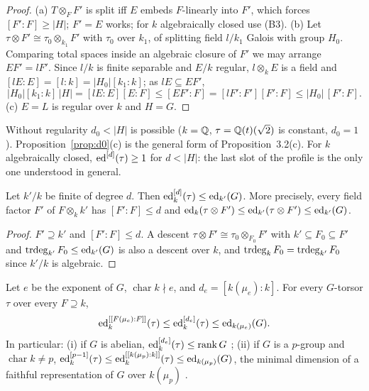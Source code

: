 \begin{proof}
(a) $T\otimes_FF'$ is split iff $E$ embeds $F$-linearly into $F'$, which forces
$[F':F]\ge|H|$; $F'=E$ works; for $k$ algebraically closed use (B3).
(b) Let $\tau\otimes F'\cong\tau_0\otimes_{k_1}F'$ with $\tau_0$ over $k_1$, of
splitting field $l/k_1$ Galois with group $H_0$. Comparing total spaces inside an
algebraic closure of $F'$ we may arrange $EF'=lF'$. Since $l/k$ is finite separable
and $E/k$ regular, $l\otimes_kE$ is a field and $[lE:E]=[l:k]=|H_0|[k_1:k]$; as
$lE\subseteq EF'$,
\[
|H_0|[k_1:k]\,|H|=[lE:E][E:F]\le[EF':F]=[lF':F'][F':F]\le|H_0|\,[F':F].
\]
(c) $E=L$ is regular over $k$ and $H=G$.
\end{proof}

\begin{remark}
Without regularity $d_0<|H|$ is possible ($k=\mathbb Q$, $\tau=\mathbb Q(t)(\sqrt2)$ is constant,
$d_0=1$). Proposition~\ref{prop:d0}(c) is the general form of Proposition~3.2(c). For
$k$ algebraically closed, $\operatorname{ed}^{[d]}(\tau)\ge1$ for $d<|H|$: the last slot of the profile
is the only one understood in general.
\end{remark}

\begin{proposition}\label{prop:bfe}
Let $k'/k$ be finite of degree $d$. Then $\operatorname{ed}^{[d]}_k(\tau)\le\operatorname{ed}_{k'}(G)$. More
precisely, every field factor $F'$ of $F\otimes_kk'$ has $[F':F]\le d$ and
$\operatorname{ed}_k(\tau\otimes F')\le\operatorname{ed}_{k'}(\tau\otimes F')\le\operatorname{ed}_{k'}(G)$.
\end{proposition}

\begin{proof}
$F'\supseteq k'$ and $[F':F]\le d$. A descent $\tau\otimes F'\cong\tau_0\otimes_{F_0}
F'$ with $k'\subseteq F_0\subseteq F'$ and $\operatorname{trdeg}_{k'}F_0\le\operatorname{ed}_{k'}(G)$ is also a
descent over $k$, and $\operatorname{trdeg}_kF_0=\operatorname{trdeg}_{k'}F_0$ since $k'/k$ is algebraic.
\end{proof}

\begin{corollary}\label{cor:rou}
Let $e$ be the exponent of $G$, $\operatorname{char}k\nmid e$, and
$d_e=[k(\mu_e):k]$. For every $G$-torsor $\tau$ over every $F\supseteq k$,
\[
\operatorname{ed}^{[[F(\mu_e):F]]}_k(\tau)\le\operatorname{ed}^{[d_e]}_k(\tau)\le\operatorname{ed}_{k(\mu_e)}(G).
\]
In particular: (i) if $G$ is abelian, $\operatorname{ed}^{[d_e]}_k(\tau)\le\operatorname{rank}G$
\cite{BR}; (ii) if $G$ is a $p$-group and $\operatorname{char}k\ne p$,
$\operatorname{ed}^{[p-1]}_k(\tau)\le\operatorname{ed}^{[[k(\mu_p):k]]}_k(\tau)\le\operatorname{ed}_{k(\mu_p)}(G)$, the minimal
dimension of a faithful representation of $G$ over $k(\mu_p)$ \cite{KM}.
\end{corollary}

